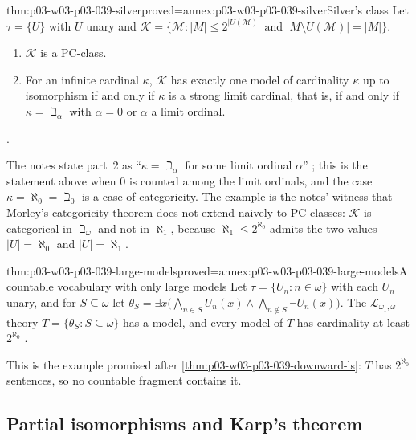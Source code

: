\begin{hbtheorem}{thm:p03-w03-p03-039-silver}{proved=annex:p03-w03-p03-039-silver}{Silver's class}
Let \(\tau=\{U\}\) with \(U\) unary and
\(\mathcal K=\{\mathcal M:\lvert M\rvert\le2^{\lvert U(\mathcal M)\rvert}
\text{ and }\lvert M\setminus U(\mathcal M)\rvert=\lvert M\rvert\}\).
\begin{enumerate}
\item \(\mathcal K\) is a \(\mathrm{PC}\)-class.
\item For an infinite cardinal \(\kappa\), \(\mathcal K\) has exactly one model of
      cardinality \(\kappa\) up to isomorphism if and only if \(\kappa\) is a
      strong limit cardinal, that is, if and only if \(\kappa=\beth_\alpha\)
      with \(\alpha=0\) or \(\alpha\) a limit ordinal.
\end{enumerate}
\cite[Ex.~1.13, pp.~7--8]{Marker2014InfinitaryNotes}.
\end{hbtheorem}

The notes state part~2 as ``\(\kappa=\beth_\alpha\) for some limit ordinal
\(\alpha\)'' \cite[p.~8]{Marker2014InfinitaryNotes}; this is the statement
above when \(0\) is counted among the limit ordinals, and the case
\(\kappa=\aleph_0=\beth_0\) is a case of categoricity. The example is the
notes' witness that Morley's categoricity theorem does not extend naively to
\(\mathrm{PC}\)-classes: \(\mathcal K\) is categorical in \(\beth_\omega\) and
not in \(\aleph_1\), because \(\aleph_1\le2^{\aleph_0}\) admits the two
values \(\lvert U\rvert=\aleph_0\) and \(\lvert U\rvert=\aleph_1\).

\begin{hbtheorem}{thm:p03-w03-p03-039-large-models}{proved=annex:p03-w03-p03-039-large-models}{A countable vocabulary with only large models}
Let \(\tau=\{U_n:n\in\omega\}\) with each \(U_n\) unary, and for
\(S\subseteq\omega\) let
\(\theta_S=\exists x\bigl(\bigwedge_{n\in S}U_n(x)\wedge\bigwedge_{n\notin S}\neg U_n(x)\bigr)\).
The \(\mathcal L_{\omega_1,\omega}\)-theory \(T=\{\theta_S:S\subseteq\omega\}\)
has a model, and every model of \(T\) has cardinality at least \(2^{\aleph_0}\)
\cite[Ex.~1.15, p.~8]{Marker2014InfinitaryNotes}.
\end{hbtheorem}

This is the example promised after \cref{thm:p03-w03-p03-039-downward-ls}:
\(T\) has \(2^{\aleph_0}\) sentences, so no countable fragment contains it.

\subsection{Partial isomorphisms and Karp's theorem}
\label{sec:p03-w03-p03-039-karp}

